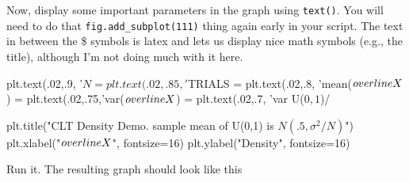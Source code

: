 \begin{fullwidth}

\step Now, display some important parameters in the graph using {\tt text()}. You will need to do that {\tt fig.add\_subplot(111)} thing again early in your script. The text in between the \$ symbols is latex and lets us display nice math symbols (e.g., the title), although I'm not doing much with it here.

{\small
\begin{pyverbatim}
plt.text(.02,.9, '$N = %
plt.text(.02,.85,'$TRIALS = %
plt.text(.02,.8, 'mean($\\overline{X}$) = %
plt.text(.02,.75,'var($\\overline{X}$) = %
plt.text(.02,.7, 'var U($0,1$)/%

plt.title("CLT Density Demo. sample mean of U(0,1) is $N(.5, \sigma^2/N)$")
plt.xlabel("$\\overline{X}$", fontsize=16)
plt.ylabel("Density", fontsize=16)
\end{pyverbatim}
}

\step Run it. The resulting graph should look like this \\


\end{fullwidth}
